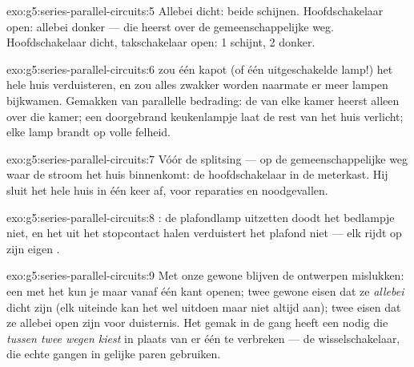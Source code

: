 \begin{solution}{exo:g5:series-parallel-circuits:5}
Allebei dicht: beide  schijnen. Hoofdschakelaar open: allebei
donker --- die heerst over de gemeenschappelijke weg. Hoofdschakelaar
dicht, takschakelaar open:  1 schijnt,  2 donker.
\end{solution}

\begin{solution}{exo:g5:series-parallel-circuits:6}
 zou één kapot  (of één uitgeschakelde lamp!) het
hele huis verduisteren, en zou alles zwakker worden naarmate er meer
lampen bijkwamen. Gemakken van parallelle bedrading: de
 van elke kamer heerst alleen over die kamer; een
doorgebrand keukenlampje laat de rest van het huis verlicht; elke lamp
brandt op volle felheid.
\end{solution}

\begin{solution}{exo:g5:series-parallel-circuits:7}
Vóór de splitsing --- op de gemeenschappelijke weg waar de stroom het
huis binnenkomt: de hoofdschakelaar in de meterkast. Hij sluit het hele
huis in één keer af, voor reparaties en noodgevallen.
\end{solution}

\begin{solution}{exo:g5:series-parallel-circuits:8}
: de plafondlamp uitzetten doodt het bedlampje niet, en het
 uit het stopcontact halen verduistert het plafond niet --- elk
rijdt op zijn eigen .
\end{solution}

\begin{solution}{exo:g5:series-parallel-circuits:9}
Met onze gewone  blijven de ontwerpen mislukken: een
  met het  kun je maar vanaf één kant
openen; twee gewone   eisen dat ze
\emph{allebei} dicht zijn (elk uiteinde kan het  wel uitdoen
maar niet altijd aan); twee  eisen dat ze allebei open zijn
voor duisternis. Het gemak in de gang heeft een  nodig die
\emph{tussen twee wegen kiest} in plaats van er één te verbreken ---
de wisselschakelaar, die echte gangen in gelijke paren gebruiken.
\end{solution}

